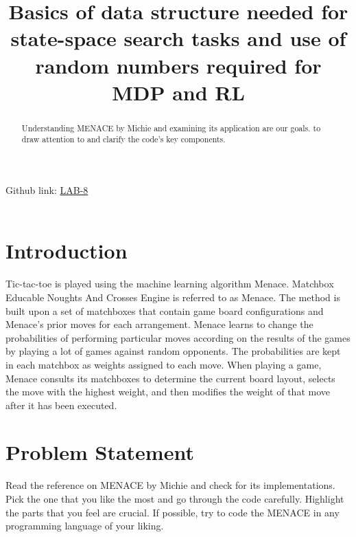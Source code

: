 \documentclass[conference]{IEEEtran}
\begin{document}
\title{Basics of data structure needed for state-space search tasks and use of random numbers required for MDP and RL}
\author{
\and
{}
\and
{}
\and
{}
}
\maketitle
\setlength{\parindent}{20pt}
\noindent Github link: \href{https://github.com/JARVIS-codebase/LAB-8}{LAB-8} \\ \\ 
\indent \begin{abstract}
Understanding MENACE by Michie and examining its application are our goals. to draw attention to and clarify the code's key components.
\end{abstract}
\IEEEpeerreviewmaketitle

\section{Introduction}
Tic-tac-toe is played using the machine learning algorithm Menace. Matchbox Educable Noughts And Crosses Engine is referred to as Menace. The method is built upon a set of matchboxes that contain game board configurations and Menace's prior moves for each arrangement. Menace learns to change the probabilities of performing particular moves according on the results of the games by playing a lot of games against random opponents. The probabilities are kept in each matchbox as weights assigned to each move. When playing a game, Menace consults its matchboxes to determine the current board layout, selects the move with the highest weight, and then modifies the weight of that move after it has been executed.
\section{Problem Statement} 
Read the reference on MENACE by Michie and check for its implementations.  Pick the one that you like the most and go through the code carefully.  Highlight the parts that you feel are crucial.  If possible, try to code the MENACE in any programming language of your liking.
\\
\\
\\
\\
\end{document}
